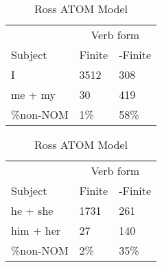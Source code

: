 \begin{table}[]
\caption{Ross ATOM Model}
\begin{minipage}{0.5\textwidth}
    \centering
    \begin{tabular}{@{}lll@{}}
        \toprule
         & \multicolumn{2}{c}{Verb form}\\
         \cline{2-3}
        Subject & Finite & -Finite \\
        \midrule
        I & 3512 & 308 \\
        me + my & 30 & 419 \\
        \hline
        \%non-NOM & 1\% & 58\% \\
        \bottomrule
    \end{tabular}
\end{minipage}
\begin{minipage}{0.5\textwidth}
    \centering
    \begin{tabular}{@{}lll@{}}
        \toprule
         & \multicolumn{2}{c}{Verb form}\\
         \cline{2-3}
        Subject & Finite & -Finite \\
        \midrule
        he + she & 1731 & 261 \\
        him + her & 27 & 140 \\
        \hline
        \%non-NOM & 2\% & 35\% \\
        \bottomrule
    \end{tabular}
    \end{minipage}


\end{table}

